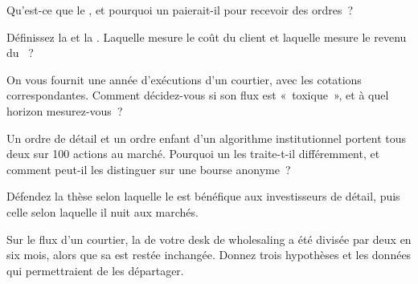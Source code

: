 \begin{interviewq}\label{iq:m1:retail-flow-and-wholesaling:1}
Qu'est-ce que le , et pourquoi un  paierait-il pour recevoir des ordres~?
\end{interviewq}

\begin{interviewq}\label{iq:m1:retail-flow-and-wholesaling:2}
Définissez la  et la . Laquelle mesure le
coût du client et laquelle mesure le revenu du ~?
\end{interviewq}

\begin{interviewq}\label{iq:m1:retail-flow-and-wholesaling:3}
On vous fournit une année d'exécutions d'un courtier, avec les cotations correspondantes. Comment décidez-vous
si son flux est «~toxique~», et à quel horizon mesurez-vous~?
\end{interviewq}

\begin{interviewq}\label{iq:m1:retail-flow-and-wholesaling:4}
Un ordre de détail et un ordre enfant d'un algorithme institutionnel portent
tous deux sur 100 actions au marché. Pourquoi un  les traite-t-il différemment, et comment
peut-il les distinguer sur une bourse anonyme~?
\end{interviewq}

\begin{interviewq}\label{iq:m1:retail-flow-and-wholesaling:5}
Défendez la thèse selon laquelle le  est bénéfique aux investisseurs de détail, puis
celle selon laquelle il nuit aux marchés.
\end{interviewq}

\begin{interviewq}\label{iq:m1:retail-flow-and-wholesaling:6}
Sur le flux d'un courtier, la  de votre desk de wholesaling a été divisée par deux
en six mois, alors que sa  est restée inchangée. Donnez trois hypothèses
et les données qui permettraient de les départager.
\end{interviewq}
